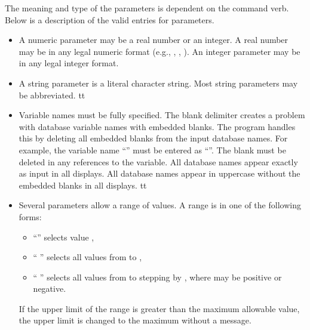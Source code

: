 The meaning and type of the parameters is dependent on the command verb.
Below is a description of the valid entries for parameters.
\setlength{\itemsep}{\medskipamount} \begin{itemize}
%
\item
A numeric parameter may be a real number or an integer. A real number
may be in any legal  numeric format (e.g., ,
, ). An integer parameter may be in any legal
integer format.
\item
A string parameter is a literal character string. Most string parameters
may be abbreviated.
%
\newcommand{\okname}{f}
\ifx\PROGRAM\BLOT \renewcommand{\okname}{t} \fi
\ifx\PROGRAM\ALGEBRA \renewcommand{\okname}{t} \fi
\ifx\PROGRAM\GROPE \renewcommand{\okname}{t} \fi
\if\okname t
\item
Variable names must be fully specified. The blank delimiter creates a
problem with database variable names with embedded blanks. The program
handles this by deleting all embedded blanks from the input database
names. For example, the variable name ``'' must be entered as
``''. The blank must be deleted in any references to the
variable.
\ifx\PROGRAM\GROPE
All database names appear exactly as input in all displays.
\else
All database names appear in uppercase without the embedded blanks in
all displays.
\fi
\fi
\newcommand{\okrange}{f}
\ifx\PROGRAM\BLOT \renewcommand{\okrange}{t} \fi
\ifx\PROGRAM\GROPE \renewcommand{\okrange}{t} \fi
\ifx\PROGRAM\NUMBERS \renewcommand{\okrange}{t} \fi
\if\okrange t
\item
Several parameters allow a range of values. A range is in one of the
following forms:
\setlength{\itemsep}{\medskipamount} \begin{itemize}
\item ``'' selects value ,
\item ``  '' selects all values from
 to ,
\item ``    ''
selects all values from  to  stepping by
, where  may be positive or negative.
\end{itemize}
If the upper limit of the range is greater than the maximum allowable
value, the upper limit is changed to the maximum without a message.
\fi
\end{itemize}

